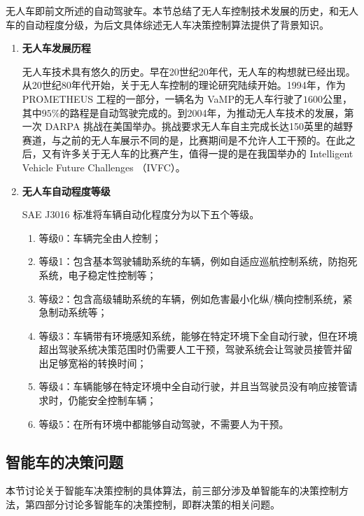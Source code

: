 无人车即前文所述的自动驾驶车。本节总结了无人车控制技术发展的历史，和无人车的自动程度分级，为后文具体综述无人车决策控制算法提供了背景知识。

\begin{enumerate}[wide=\parindent]
\item \textbf{无人车发展历程}

无人车技术具有悠久的历史。早在20世纪20年代，无人车的构想就已经出现\cite{Adrienne2016Your}。从20世纪80年代开始，关于无人车控制的理论研究陆续开始\cite{Dickmanns1988Dynamic}。1994年，作为 PROMETHEUS 工程\cite{eureka2016}的一部分，一辆名为 VaMP的无人车\cite{vamp2017}行驶了$1600$公里，其中$95\%$的路程是自动驾驶完成的。到2004年，为推动无人车技术的发展，第一次 DARPA 挑战在美国举办。挑战要求无人车自主完成长达150英里的越野赛道，与之前的无人车展示不同的是，比赛期间是不允许人工干预的。在此之后，又有许多关于无人车的比赛产生，值得一提的是在我国举办的 Intelligent Vehicle Future Challenges （IVFC）\cite{Xin2014China}。

\item \textbf{无人车自动程度等级}

SAE J3016 标准\cite{SO2014Taxonomy}将车辆自动化程度分为以下五个等级。
\begin{enumerate}[label=(\arabic*),wide=\parindent]
\item 等级0：车辆完全由人控制；

\item 等级1：包含基本驾驶辅助系统的车辆，例如自适应巡航控制系统，防抱死系统，电子稳定性控制\cite{Rajamani2011Vehicle}等；

\item 等级2：包含高级辅助系统的车辆，例如危害最小化纵/横向控制系统\cite{Gerdes2001A}，紧急制动系统\cite{Brannstrom2010Model,Vahidi2003Research}等；

\item 等级3：车辆带有环境感知系统，能够在特定环境下全自动行驶，但在环境超出驾驶系统决策范围时仍需要人工干预，驾驶系统会让驾驶员接管并留出足够宽裕的转换时间；

\item 等级4：车辆能够在特定环境中全自动行驶，并且当驾驶员没有响应接管请求时，仍能安全控制车辆；

\item 等级5：在所有环境中都能够自动驾驶，不需要人为干预。
\end{enumerate}


\end{enumerate}

\subsection{智能车的决策问题}
\label{sec:single}
本节讨论关于智能车决策控制的具体算法，前三部分涉及单智能车的决策控制方法，第四部分讨论多智能车的决策控制，即群决策的相关问题。

